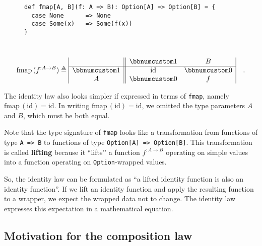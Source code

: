 \begin{wrapfigure}{l}{0.55\columnwidth}%
\vspace{-0\baselineskip}
\begin{lstlisting}
def fmap[A, B](f: A => B): Option[A] => Option[B] = {
  case None      => None
  case Some(x)   => Some(f(x))
}
\end{lstlisting}
\vspace{-2\baselineskip}
\end{wrapfigure}%

~\vspace{-0.7\baselineskip}
\begin{equation}
\text{fmap}\,(f^{:A\rightarrow B})\triangleq\begin{array}{|c||cc|}
 & \bbnum 1 & B\\
\hline \bbnum 1 & \text{id} & \bbnum 0\\
A & \bbnum 0 & f
\end{array}\quad.\label{eq:f-def-opt-fmap-matrix-notation}
\end{equation}
\vspace{-0.5\baselineskip}

The identity law also looks simpler if expressed in terms of \lstinline!fmap!,
namely $\text{fmap}\,(\text{id})=\text{id}$. In writing $\text{fmap}\,(\text{id})=\text{id}$,
we omitted the type parameters $A$ and $B$, which must be both equal.

Note that the type signature of \lstinline!fmap! looks like a transformation
from functions of type \lstinline!A => B! to functions of type \lstinline!Option[A] => Option[B]!.
This transformation is called \textbf{lifting} because
it \textsf{``}lifts\textsf{'}' a function $f^{:A\rightarrow B}$ operating on simple
values into a function operating on \lstinline!Option!-wrapped values. 

So, the identity law can be formulated as \textsf{``}a lifted identity function
is also an identity function\textsf{''}. If we lift an identity function and
apply the resulting function to a wrapper, we expect the wrapped data
not to change. The identity law expresses this expectation in a mathematical
equation.

\subsection{Motivation for the composition law}

